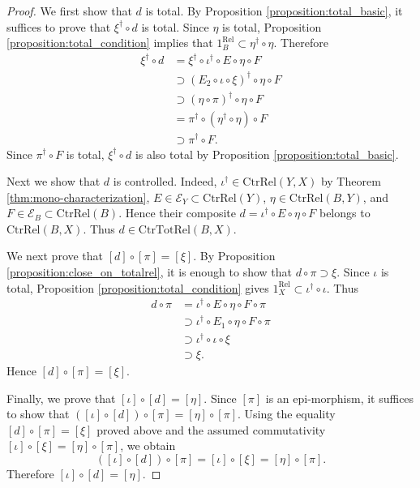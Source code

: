 \documentclass[12pt, a4paper]{amsart}
\theoremstyle{definition}
\newcommand{\Rel}{\mathrm{Rel}}
\newcommand{\CtrTotRel}{\mathrm{CtrTotRel}}
\newcommand{\CtrRel}{\mathrm{CtrRel}}
\begin{document}
\begin{proof}
We first show that $d$ is total.
By Proposition \ref{proposition:total_basic}, it suffices to prove that
$\xi^\dagger\circ d$ is total.
Since $\eta$ is total, Proposition \ref{proposition:total_condition} implies
that $1_B^{\Rel}\subset \eta^\dagger\circ\eta$.
Therefore
\begin{align*}
\xi^\dagger \circ d
    &= \xi^\dagger \circ \iota^\dagger \circ E \circ \eta \circ F \\
    &\supset (E_2 \circ \iota \circ \xi)^\dagger \circ \eta \circ F \\
    &\supset (\eta \circ \pi)^\dagger \circ \eta \circ F \\
    &= \pi^\dagger \circ (\eta^\dagger \circ \eta) \circ F \\
    &\supset \pi^\dagger \circ F.
\end{align*}
Since $\pi^\dagger\circ F$ is total,
$\xi^\dagger\circ d$ is also total by Proposition
\ref{proposition:total_basic}.

Next we show that $d$ is controlled.
Indeed,
$\iota^\dagger\in\CtrRel(Y,X)$ by Theorem
\ref{thm:mono-characterization},
$E \in\mathcal{E}_Y\subset\CtrRel(Y)$,
$\eta\in\CtrRel(B,Y)$, and
$F \in\mathcal{E}_B\subset\CtrRel(B)$.
Hence their composite
$d=\iota^\dagger\circ E \circ\eta\circ F$
belongs to $\CtrRel(B,X)$.
Thus $d\in\CtrTotRel(B,X)$.

We next prove that $[d]\circ[\pi]=[\xi]$.
By Proposition \ref{proposition:close_on_totalrel}, it is enough to show
that $d\circ\pi\supset\xi$.
Since $\iota$ is total, Proposition \ref{proposition:total_condition} gives
$1_X^{\Rel}\subset\iota^\dagger\circ\iota$.
Thus
\begin{align*}
d\circ\pi
    &= \iota^\dagger\circ E \circ\eta\circ F \circ\pi \\
    &\supset \iota^\dagger\circ E_1 \circ\eta\circ F\circ\pi \\
    &\supset \iota^\dagger\circ\iota\circ\xi \\
    &\supset \xi .
\end{align*}
Hence $[d]\circ[\pi]=[\xi]$.

Finally, we prove that $[\iota]\circ[d]=[\eta]$.
Since $[\pi]$ is an epi-morphism, it suffices to show that
$([\iota]\circ[d])\circ[\pi]=[\eta]\circ[\pi]$.
Using the equality $[d]\circ[\pi]=[\xi]$ proved above and the assumed
commutativity $[\iota]\circ[\xi]=[\eta]\circ[\pi]$, we obtain
\[
([\iota]\circ[d])\circ[\pi]
=
[\iota]\circ[\xi]
=
[\eta]\circ[\pi].
\]
Therefore $[\iota]\circ[d]=[\eta]$.
\end{proof}
\end{document}
